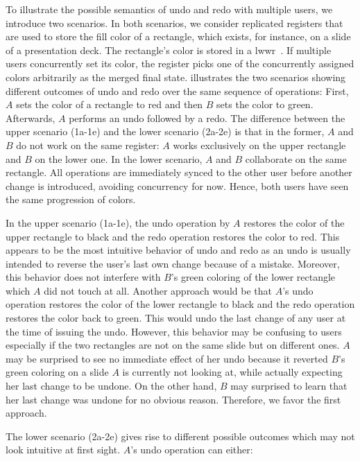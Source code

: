 \documentclass[sigplan,natbib=false,review]{acmart}
\begin{document}
To illustrate the possible semantics of undo and redo with multiple users,
we introduce two scenarios.
In both scenarios, we consider replicated registers that are used to store
the fill color of a rectangle, which exists, for instance, on a slide of
a presentation deck.
The rectangle's color is stored in a \gls*{lwwr}~\cite{shapiro2011comprehensive}.
If multiple users concurrently set its color, the register picks one of
the concurrently assigned colors arbitrarily as the merged final state.
 illustrates the two scenarios showing different outcomes
of undo and redo over the same sequence of operations:
First, $A$ sets the color of a rectangle to red and then $B$ sets the color to
green. Afterwards, $A$ performs an undo followed by a redo.
The difference between the upper scenario (1a-1e) and the lower scenario (2a-2e)
is that in the former, $A$ and $B$ do not work on the same register:
$A$ works exclusively on the upper rectangle and $B$ on the lower one.
In the lower scenario, $A$ and $B$ collaborate on the same rectangle.
All operations are immediately synced to the other user before another change
is introduced, avoiding concurrency for now.
Hence, both users have seen the same progression of colors.

In the upper scenario (1a-1e), the undo operation by $A$ restores the color of
the upper rectangle to black and the redo operation restores the color to red.
This appears to be the most intuitive behavior of undo and redo as an undo is
usually intended to reverse the user's last own change because of a mistake.
Moreover, this behavior does not interfere with $B$'s green coloring of the
lower rectangle which $A$ did not touch at all.
Another approach would be that $A$'s undo operation restores the color of the
lower rectangle to black and the redo operation restores the color back to green.
This would undo the last change of any user at the time of issuing the undo.
However, this behavior may be confusing to users especially if 
the two rectangles are not on the same slide but on different ones.
$A$ may be surprised to see no immediate effect of her undo because it reverted
$B$'s green coloring on a slide $A$ is currently not looking at,
while actually expecting her last change to be undone.
On the other hand, $B$ may surprised to learn that her last
change was undone for no obvious reason.
Therefore, we favor the first approach.

The lower scenario (2a-2e) gives rise to different possible outcomes which may
not look intuitive at first sight.
$A$'s undo operation can either:
\end{document}
